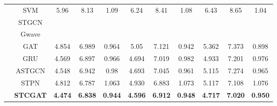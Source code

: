 \documentclass[12pt,a4paper]{report}
\begin{document}
\begin{table}[h]
\begin{tabular}{ccccccccccc}
                                          & SVM             & 5.96                         & 8.13                       & \multicolumn{1}{c|}{1.09}           & 6.24           & 8.41           & \multicolumn{1}{c|}{1.08}           & 6.43           & 8.65            & 1.04           \\
                                          & STGCN           &                              &                            & \multicolumn{1}{c|}{}               &                &                & \multicolumn{1}{c|}{}               &                &                 &                \\
                                          & Gwave           &                              &                            & \multicolumn{1}{c|}{}               &                &                & \multicolumn{1}{c|}{}               &                &                 &                \\
                                          & GAT             & 4.854                        & 6.989                      & \multicolumn{1}{c|}{0.964}          & 5.05           & 7.121          & \multicolumn{1}{c|}{0.942}          & 5.362          & 7.373           & 0.898          \\
                                          & GRU             & 4.569                        & 6.897                      & \multicolumn{1}{c|}{0.966}          & 4.694          & 7.019          & \multicolumn{1}{c|}{0.982}          & 4.933          & 7.201           & 0.976          \\
                                          & ASTGCN          & 4.548                        & 6.942                      & \multicolumn{1}{c|}{0.98}           & 4.693          & 7.045          & \multicolumn{1}{c|}{0.961}          & 5.115          & 7.274           & 0.965          \\
                                          & STPN            & 4.812                        & 6.787                      & \multicolumn{1}{c|}{1.063}          & 4.930          & 6.883          & \multicolumn{1}{c|}{1.073}          & 5.117          & 7.108           & 1.076          \\
                                          & \textbf{STCGAT} & \textbf{4.474}               & \textbf{6.838}             & \multicolumn{1}{c|}{\textbf{0.944}} & \textbf{4.596} & \textbf{6.912} & \multicolumn{1}{c|}{\textbf{0.948}} & \textbf{4.717} & \textbf{7.020}  & \textbf{0.950} \\\bottomrule
    \end{tabular}
\end{table}
\end{document}
